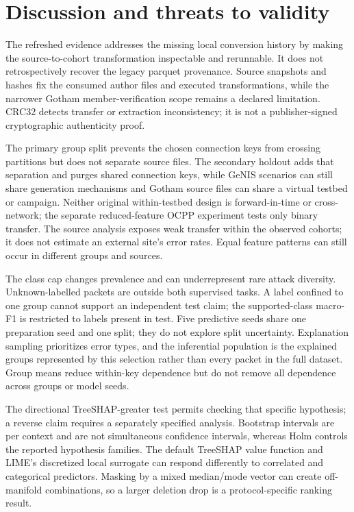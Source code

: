 \documentclass[conference,letterpaper]{IEEEtran}
\begin{document}
\section{Discussion and threats to validity}
The refreshed evidence addresses the missing local conversion history by making the source-to-cohort transformation inspectable and rerunnable. It does not retrospectively recover the legacy parquet provenance. Source snapshots and hashes fix the consumed author files and executed transformations, while the narrower Gotham member-verification scope remains a declared limitation. CRC32 detects transfer or extraction inconsistency; it is not a publisher-signed cryptographic authenticity proof.

The primary group split prevents the chosen connection keys from crossing partitions but does not separate source files. The secondary holdout adds that separation and purges shared connection keys, while GeNIS scenarios can still share generation mechanisms and Gotham source files can share a virtual testbed or campaign. Neither original within-testbed design is forward-in-time or cross-network; the separate reduced-feature OCPP experiment tests only binary transfer. The source analysis exposes weak transfer within the observed cohorts; it does not estimate an external site's error rates. Equal feature patterns can still occur in different groups and sources.

The class cap changes prevalence and can underrepresent rare attack diversity. Unknown-labelled packets are outside both supervised tasks. A label confined to one group cannot support an independent test claim; the supported-class macro-F1 is restricted to labels present in test. Five predictive seeds share one preparation seed and one split; they do not explore split uncertainty. Explanation sampling prioritizes error types, and the inferential population is the explained groups represented by this selection rather than every packet in the full dataset. Group means reduce within-key dependence but do not remove all dependence across groups or model seeds.

The directional TreeSHAP-greater test permits checking that specific hypothesis; a reverse claim requires a separately specified analysis. Bootstrap intervals are per context and are not simultaneous confidence intervals, whereas Holm controls the reported hypothesis families. The default TreeSHAP value function and LIME's discretized local surrogate can respond differently to correlated and categorical predictors. Masking by a mixed median/mode vector can create off-manifold combinations, so a larger deletion drop is a protocol-specific ranking result.
\end{document}
